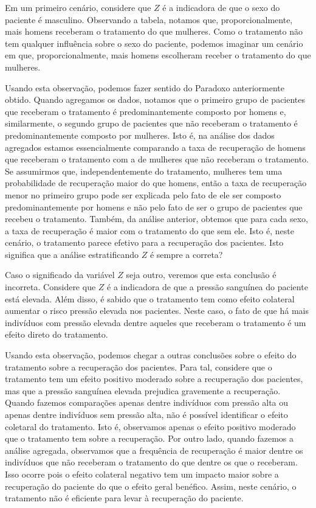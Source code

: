 Em um primeiro cenário, considere que $Z$ é a indicadora de que
o sexo do paciente é masculino.
Observando a tabela, notamos que, proporcionalmente, 
mais homens receberam o tratamento do que mulheres.
Como o tratamento não tem qualquer influência sobre o sexo do paciente,
podemos imaginar um cenário em que, proporcionalmente,
mais homens escolheram receber o tratamento do que mulheres.

Usando esta observação,
podemos fazer sentido do Paradoxo anteriormente obtido.
Quando agregamos os dados,
notamos que o primeiro grupo de pacientes que 
receberam o tratamento é predominantemente composto por homens e,
similarmente, o segundo grupo de 
pacientes que não receberam o tratamento é
predominantemente composto por mulheres.
Isto é, na análise dos dados agregados estamos 
essencialmente comparando a taxa de recuperação de homens 
que receberam o tratamento com
a de mulheres que não receberam o tratamento.
Se assumirmos que, independentemente do tratamento, 
mulheres tem uma probabilidade de recuperação maior do que homens,
então a taxa de recuperação menor no primeiro grupo pode ser explicada
pelo fato de ele ser composto predominantemente por homens e
não pelo fato de ser o grupo de pacientes que recebeu o tratamento.
Também, da análise anterior, obtemos que para cada sexo, 
a taxa de recuperação é maior com o tratamento  do que sem ele. 
Isto é, neste cenário, o tratamento parece efetivo para
a recuperação dos pacientes.
Isto significa que a análise estratificando $Z$ é sempre a correta?

Caso o significado da variável $Z$ seja outro, veremos que 
esta conclusão é incorreta.
Considere que $Z$ é a indicadora de que 
a pressão sanguínea do paciente está elevada.
Além disso, é sabido que o tratamento tem como
efeito colateral aumentar o risco
pressão elevada nos pacientes.
Neste caso, o fato de que
há mais indivíduos com pressão elevada dentre aqueles que
receberam o tratamento é
um efeito direto do tratamento.

Usando esta observação,
podemos chegar a outras conclusões sobre o
efeito do tratamento sobre a recuperação dos pacientes.
Para tal, considere que o tratamento tem
um efeito positivo moderado sobre a recuperação dos pacientes,
mas que a pressão sanguínea elevada prejudica gravemente a recuperação.
Quando fazemos comparações apenas dentre indivíduos com pressão alta ou
apenas dentre indivíduos sem pressão alta, 
não é possível identificar o efeito coletaral do tratamento.
Isto é, observamos apenas
o efeito positivo moderado que o tratamento tem sobre a recuperação.
Por outro lado, quando fazemos a análise agregada,
observamos que a frequência de recuperação é 
maior dentre os indivíduos que não receberam o tratamento
do que dentre os que o receberam.
Isso ocorre pois o efeito colateral negativo tem um impacto
maior sobre a recuperação do paciente do que o efeito geral benéfico.
Assim, neste cenário, o tratamento não é
eficiente para levar à recuperação do paciente.

